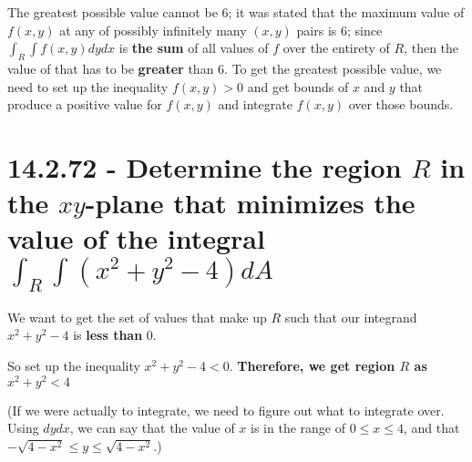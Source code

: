 \documentclass{article}
\begin{document}
\par\noindent\large The greatest possible value cannot be 6; it was stated that the maximum value of $f(x, y)$ at any of possibly infinitely many $(x, y)$ pairs is 6; since $\int_{R}\int f(x, y) dydx$ is \textbf{the sum} of all values of $f$ over the entirety of $R$, then the value of that has to be \textbf{greater} than 6.  To get the greatest possible value, we need to set up the inequality $f(x, y) > 0$ and get bounds of $x$ and $y$ that produce a positive value for $f(x, y)$ and integrate $f(x, y)$ over those bounds.

\section{14.2.72 - Determine the region $R$ in the $xy$-plane that minimizes the value of the integral $\int_{R}\int (x^{2} + y^{2} - 4) dA$}

\par\noindent\large We want to get the set of values that make up $R$ such that our integrand $x^{2} + y^{2} - 4$ is \textbf{less than} 0.
\par\noindent So set up the inequality $x^{2} + y^{2} - 4 < 0$.  \textbf{Therefore, we get region $R$ as $x^{2} + y^{2} < 4$}\vspace{0.25cm}

\par\noindent (If we were actually to integrate, we need to figure out what to integrate over. Using $dydx$, we can say that the value of $x$ is in the range of $0 \leq x \leq 4$, and that $-\sqrt{4 - x^{2}} \leq y \leq \sqrt{4 - x^{2}}$.)\vspace{0.25cm}


\end{document}
